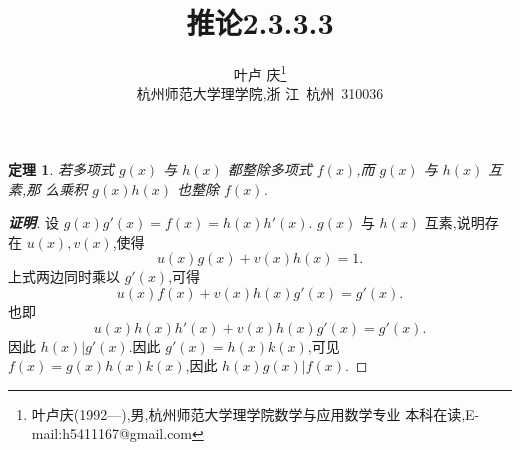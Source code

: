 \documentclass[twoside,11pt]{article}
\newtheorem{theorem}{定理}
\begin{document}
\title{\huge{\bf{推论2.3.3.3}}} \author{\small{叶卢
    庆\footnote{叶卢庆(1992---),男,杭州师范大学理学院数学与应用数学专业
      本科在读,E-mail:h5411167@gmail.com}}\\{\small{杭州师范大学理学院,浙
      江~杭州~310036}}} \date{}
\maketitle





\vspace{30pt} %

\begin{theorem}
若多项式 $g(x)$ 与 $h(x)$ 都整除多项式 $f(x)$,而 $g(x)$ 与 $h(x)$ 互素,那
么乘积 $g(x)h(x)$ 也整除 $f(x)$.
\end{theorem}
\begin{proof}[\bf{证明}]
设 $g(x)g'(x)=f(x)=h(x)h'(x)$.  $g(x)$ 与 $h(x)$ 互素,说明存在 $u(x),v(x)$,使得
$$
u(x)g(x)+v(x)h(x)=1.
$$
上式两边同时乘以 $g'(x)$,可得
$$
u(x)f(x)+v(x)h(x)g'(x)=g'(x).
$$
也即
$$
u(x)h(x)h'(x)+v(x)h(x)g'(x)=g'(x).
$$
因此 $h(x)|g'(x)$.因此 $g'(x)=h(x)k(x)$,可见 $f(x)=g(x)h(x)k(x)$,因此 $h(x)g(x)|f(x)$.
\end{proof}
\end{document}
